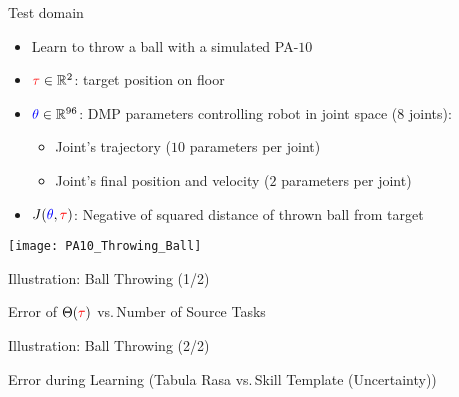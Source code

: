 \documentclass[11pt]{beamer}
\newcommand{\taskparam}{{\color{red} \tau}}
\newcommand{\skillparam}{{\color{blue} \theta}}
\begin{document}
\begin{frame}{Test domain}
  \begin{itemize}
    \item Learn to throw a ball with a simulated PA-$10$
    \item $\taskparam \in \mathbb{R}^2$: target position on floor
    \item $\skillparam \in \mathbb{R}^{96}$: DMP parameters controlling robot in joint space ($8$ joints):
    \begin{itemize}
      \item Joint's trajectory ($10$ parameters per joint)
      \item Joint's final position and velocity ($2$ parameters per joint)
    \end{itemize}
    \item $J(\skillparam,\taskparam)$: Negative of squared distance of thrown ball from target
  \end{itemize}
  \begin{center}
    \texttt{[image: PA10\_Throwing\_Ball]}
  \end{center}
\end{frame}

\begin{frame}{Illustration: Ball Throwing (1/2)}
   \begin{center}
   Error of $\Theta(\taskparam)$ vs.\,Number of Source Tasks
   \end{center}
   \begin{center}
   \end{center}
\end{frame}

\begin{frame}{Illustration: Ball Throwing (2/2)}
   \begin{center}
   Error during Learning (Tabula Rasa vs.\,Skill Template (Uncertainty))
   \end{center}
   \begin{center}
   \end{center}
\end{frame}
\end{document}
